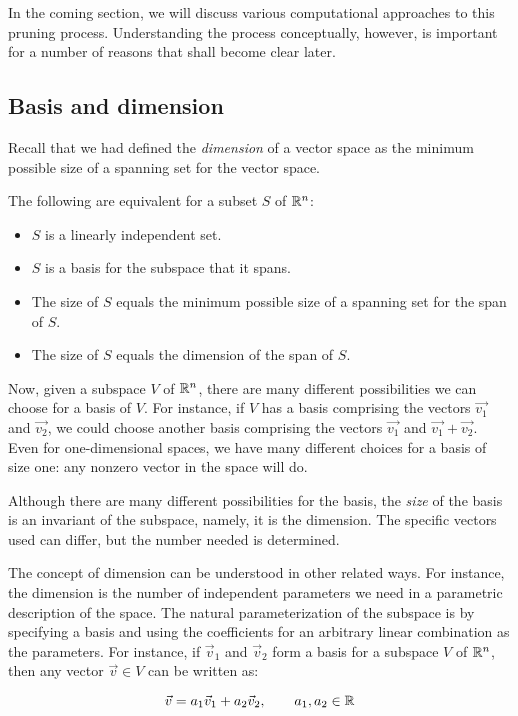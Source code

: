 \documentclass[10pt]{amsart}
\begin{document}
In the coming section, we will discuss various computational
approaches to this pruning process. Understanding the process
conceptually, however, is important for a number of reasons that shall
become clear later.

\subsection{Basis and dimension}

Recall that we had defined the {\em dimension} of a vector space as
the minimum possible size of a spanning set for the vector space.

The following are equivalent for a subset $S$ of $\mathbb{R}^n$:

\begin{itemize}
\item $S$ is a linearly independent set.
\item $S$ is a basis for the subspace that it spans.
\item The size of $S$ equals the minimum possible size of a spanning
  set for the span of $S$.
\item The size of $S$ equals the dimension of the span of $S$.
\end{itemize}

Now, given a subspace $V$ of $\mathbb{R}^n$, there are many different
possibilities we can choose for a basis of $V$. For instance, if $V$
has a basis comprising the vectors $\vec{v_1}$ and $\vec{v_2}$, we
could choose another basis comprising the vectors $\vec{v_1}$ and
$\vec{v_1} + \vec{v_2}$. Even for one-dimensional spaces, we have many
different choices for a basis of size one: any nonzero vector in the
space will do.

Although there are many different possibilities for the basis, the
{\em size} of the basis is an invariant of the subspace, namely, it is
the dimension. The specific vectors used can differ, but the number
needed is determined.

The concept of dimension can be understood in other related ways. For
instance, the dimension is the number of independent parameters we
need in a parametric description of the space. The natural
parameterization of the subspace is by specifying a basis and using the
coefficients for an arbitrary linear combination as the
parameters. For instance, if $\vec{v}_1$ and $\vec{v}_2$ form a basis
for a subspace $V$ of $\mathbb{R}^n$, then any vector $\vec{v} \in V$ can be written as:

$$\vec{v} = a_1\vec{v}_1 + a_2 \vec{v}_2, \qquad a_1,a_2 \in \mathbb{R}$$
\end{document}
